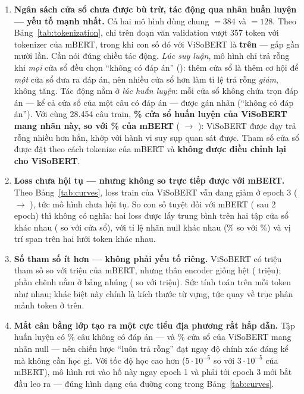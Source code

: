 \begin{enumerate}
  \item \textbf{Ngân sách cửa sổ chưa được bù trừ, tác động qua nhãn huấn luyện --- yếu tố mạnh
        nhất.} Cả hai mô hình dùng chung  $= 384$ và 
        $= 128$. Theo Bảng~\ref{tab:tokenization}, chỉ \tokCtxOverMbert{} trên \tokCtxTotal{}
        đoạn văn validation vượt 357 token với tokenizer của mBERT, trong khi con số đó với
        ViSoBERT là \textbf{\tokCtxOverViso{} trên \tokCtxTotal} --- gấp gần mười lần. Cần nói đúng
        chiều tác động. \emph{Lúc suy luận}, mô hình chỉ trả rỗng khi \emph{mọi} cửa sổ đều chọn
        ``không có đáp án'' (): thêm cửa sổ là thêm cơ hội để
        \emph{một} cửa sổ đưa ra đáp án, nên nhiều cửa sổ hơn làm tỉ lệ trả rỗng \emph{giảm}, không
        tăng. Tác động nằm ở \emph{lúc huấn luyện}: mỗi cửa sổ không chứa trọn đáp án --- kể cả
        cửa sổ của một câu có đáp án --- được gán nhãn \code{[CLS]} (``không có đáp án''). Với cùng
        28.454 câu train, \textbf{\nullRateViso\% cửa sổ huấn luyện của ViSoBERT mang nhãn này, so
        với \nullRateMbert\% của mBERT} ( $\to$
        ): ViSoBERT được dạy trả rỗng nhiều hơn hẳn, khớp
        với hành vi suy sụp quan sát được. Tham số cửa sổ được đặt theo cách tokenize của mBERT và
        \textbf{không được điều chỉnh lại cho ViSoBERT}.
  \item \textbf{Loss chưa hội tụ --- nhưng không so trực tiếp được với mBERT.} Theo
        Bảng~\ref{tab:curves}, loss train của ViSoBERT vẫn đang giảm ở epoch 3
        (\curveVisoLossII{} $\to$ \curveVisoLossIII), tức mô hình chưa hội tụ. So con số tuyệt đối
        với mBERT (\curveMbertLossII{} sau 2 epoch) thì không có nghĩa: hai loss được lấy trung bình
        trên hai tập cửa sổ khác nhau (\nullFeaturesViso{} so với \nullFeaturesMbert{} cửa sổ), với
        tỉ lệ nhãn null khác nhau (\nullRateViso\% so với \nullRateMbert\%) và vị trí span trên hai
        lưới token khác nhau.
  \item \textbf{Số tham số ít hơn --- không phải yếu tố riêng.} ViSoBERT có \tokParamsViso{} triệu
        tham số so với \tokParamsMbert{} triệu của mBERT, nhưng thân encoder giống hệt
        (\tokBodyParamsViso{} triệu); phần chênh nằm ở bảng nhúng (\tokEmbParamsViso{} so với
        \tokEmbParamsMbert{} triệu). Sức tính toán trên mỗi token như nhau; khác biệt này chính là
        kích thước từ vựng, tức quay về trục phân mảnh token ở trên.
  \item \textbf{Mất cân bằng lớp tạo ra một cực tiểu địa phương rất hấp dẫn.} Tập huấn luyện có
        \dataTrainImpPct\% câu không có đáp án --- và \nullRateViso\% cửa sổ của ViSoBERT mang nhãn null --- nên
        chiến lược ``luôn trả rỗng'' đạt ngay độ chính xác đáng kể mà không cần học gì. Với tốc độ
        học cao hơn ($5\cdot10^{-5}$ so với $3\cdot10^{-5}$ của mBERT), mô hình rơi vào hố này ngay
        epoch 1 và phải tới epoch 3 mới bắt đầu leo ra --- đúng hình dạng của đường cong trong
        Bảng~\ref{tab:curves}.
\end{enumerate}

